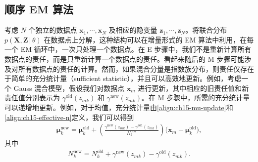 \documentclass[../../main.tex]{subfiles}
\begin{document}
\subsection{顺序 EM 算法}\label{subsection:ch15-顺序em}

考虑 $N$ 个独立的数据点 $\bm{x}_1,\cdots,\bm{x}_N$ 及相应的隐变量 $\bm{z}_1,\cdots,\bm{z}_N$。将联合分布 $p(\bm{X},\bm{Z}\,|\,\theta)$ 在数据点上分解，这种结构可以在增量形式的 EM 算法中利用，在每一个 EM 循环中，一次只处理一个数据点。在 E 步骤中，我们不是重新计算所有数据点的责任，而是只重新计算一个数据点的责任。看起来随后的 M 步骤可能涉及对所有数据点的责任的计算。然而，如果混合分量是指数族分布，则责任仅存在于简单的充分统计量（sufficient statistic），并且可以高效地更新。例如，考虑一个 Gauss 混合模型，假设我们对数据点 $\bm{x}_m$ 进行更新，其中相应的旧责任值和新责任值分别表示为 $\gamma^{\text{old}}(z_{mk})$ 和 $\gamma^{\text{new}}(z_{mk})$。在 M 步骤中，所需的充分统计量可以递增地更新。例如，对于均值，充分统计量由\eqref{align:ch15-mu-update}和\eqref{align:ch15-effective-n}定义，我们可以得到
\begin{align}
\bm{\mu}_k^{\text{new}}=\bm{\mu}_k^{\text{old}}+\left(\frac{\gamma^{\text{new}}(z_{mk})-\gamma^{\text{old}}(z_{mk})}{N_k^{\text{new}}}\right)\big(\bm{x}_m-\bm{\mu}_k^{\text{old}}\big),
\label{align:ch15-online-mu}
\end{align}
其中
\begin{align}
N_k^{\text{new}}=N_k^{\text{old}}+\gamma^{\text{new}}(z_{mk})-\gamma^{\text{old}}(z_{mk}).
\label{align:ch15-online-n}
\end{align}
\end{document}
